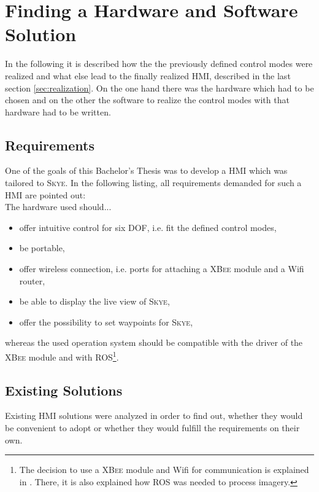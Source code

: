 \graphicspath{{graphics/HMI/}{graphics/control_modes/}}
\chapter{Finding a Hardware and Software Solution}
\label{cha:findHardSoftSolution}
In the following it is described how the the previously defined control modes were realized and what else lead to the finally realized HMI, described in the last section \ref{sec:realization}. On the one hand there was the hardware which had to be chosen and on the other the software to realize the control modes with that hardware had to be written.



\section{Requirements}
\label{sec:requirements}
One of the goals of this Bachelor's Thesis was to develop a HMI which was tailored to \textsc{Skye}. In the following listing, all requirements demanded for such a HMI are pointed out: \\

The hardware used should...
\begin{itemize}
\item{offer intuitive control for six DOF, i.e. fit the defined control modes, }
\item{be portable,}
\item{offer wireless connection, i.e. ports for attaching a \textsc{XBee} module and a Wifi router,}
\item{be able to display the live view of \textsc{Skye},}
\item{offer the possibility to set waypoints for \textsc{Skye},}
\end{itemize}
whereas the used operation system should be compatible with the driver of the \textsc{XBee} module and with ROS\footnote{The decision to use a \textsc{XBee} module and Wifi for communication is explained in \cite{burri}. There, it is also explained how \textsc{ROS} was needed to process imagery.}.


\section{Existing Solutions}
\label{sec:existingSolutions}
Existing HMI solutions were analyzed in order to find out, whether they would be convenient to adopt or whether they would fulfill the requirements on their own. 


